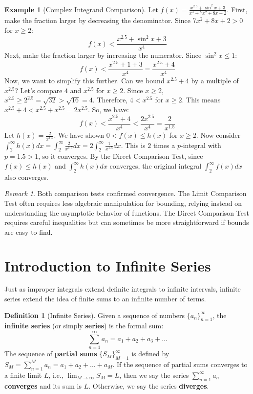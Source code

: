 \documentclass[11pt]{article}
\theoremstyle{definition}
\newtheorem{definition}[theorem]{Definition}
\newtheorem{example}[theorem]{Example}
\theoremstyle{remark}
\newtheorem{remark}[theorem]{Remark}
\begin{document}
\begin{example}[Complex Integrand Comparison]
Let $f(x) = \frac{x^{2.5} + \sin^2 x + 3}{x^4 + 7x^2 + 8x + 2}$.
First, make the fraction larger by decreasing the denominator. Since $7x^2 + 8x + 2 > 0$ for $x \ge 2$:
\[ f(x) < \frac{x^{2.5} + \sin^2 x + 3}{x^4} \]
Next, make the fraction larger by increasing the numerator. Since $\sin^2 x \le 1$:
\[ f(x) < \frac{x^{2.5} + 1 + 3}{x^4} = \frac{x^{2.5} + 4}{x^4} \]
Now, we want to simplify this further. Can we bound $x^{2.5} + 4$ by a multiple of $x^{2.5}$? Let's compare $4$ and $x^{2.5}$ for $x \ge 2$.
Since $x \ge 2$, $x^{2.5} \ge 2^{2.5} = \sqrt{32} > \sqrt{16} = 4$.
Therefore, $4 < x^{2.5}$ for $x \ge 2$.
This means $x^{2.5} + 4 < x^{2.5} + x^{2.5} = 2x^{2.5}$.
So, we have:
\[ f(x) < \frac{x^{2.5} + 4}{x^4} < \frac{2x^{2.5}}{x^4} = \frac{2}{x^{1.5}} \]
Let $h(x) = \frac{2}{x^{1.5}}$. We have shown $0 < f(x) \le h(x)$ for $x \ge 2$.
Now consider $\int_2^\infty h(x) dx = \int_2^\infty \frac{2}{x^{1.5}} dx = 2 \int_2^\infty \frac{1}{x^{1.5}} dx$.
This is $2$ times a $p$-integral with $p=1.5 > 1$, so it converges.
By the Direct Comparison Test, since $f(x) \le h(x)$ and $\int_2^\infty h(x) dx$ converges, the original integral $\int_2^\infty f(x) dx$ also converges.
\end{example}

\begin{remark}
Both comparison tests confirmed convergence. The Limit Comparison Test often requires less algebraic manipulation for bounding, relying instead on understanding the asymptotic behavior of functions. The Direct Comparison Test requires careful inequalities but can sometimes be more straightforward if bounds are easy to find.
\end{remark}


\section{Introduction to Infinite Series}

Just as improper integrals extend definite integrals to infinite intervals, infinite series extend the idea of finite sums to an infinite number of terms.

\begin{definition}[Infinite Series]
Given a sequence of numbers $\{a_n\}_{n=1}^\infty$, the \textbf{infinite series} (or simply \textbf{series}) is the formal sum:
\[ \sum_{n=1}^\infty a_n = a_1 + a_2 + a_3 + \dots \]
The sequence of \textbf{partial sums} $\{S_M\}_{M=1}^\infty$ is defined by $S_M = \sum_{n=1}^M a_n = a_1 + a_2 + \dots + a_M$.
If the sequence of partial sums converges to a finite limit $L$, i.e., $\lim_{M\to\infty} S_M = L$, then we say the series $\sum_{n=1}^\infty a_n$ \textbf{converges} and its sum is $L$. Otherwise, we say the series \textbf{diverges}.
\end{definition}
\end{document}
